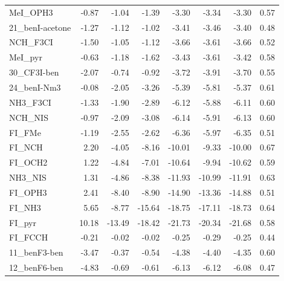{\begin{longtable}{lrrrrrrr}
MeI\_OPH3 & -0.87 & -1.04 & -1.39 & -3.30 & -3.34 & -3.30 & 0.57\\
21\_benI-acetone & -1.27 & -1.12 & -1.02 & -3.41 & -3.46 & -3.40 & 0.48\\
NCH\_F3CI & -1.50 & -1.05 & -1.12 & -3.66 & -3.61 & -3.66 & 0.52\\
MeI\_pyr & -0.63 & -1.18 & -1.62 & -3.43 & -3.61 & -3.42 & 0.58\\
30\_CF3I-ben & -2.07 & -0.74 & -0.92 & -3.72 & -3.91 & -3.70 & 0.55\\
24\_benI-Nm3 & -0.08 & -2.05 & -3.26 & -5.39 & -5.81 & -5.37 & 0.61\\
NH3\_F3CI & -1.33 & -1.90 & -2.89 & -6.12 & -5.88 & -6.11 & 0.60\\
NCH\_NIS & -0.97 & -2.09 & -3.08 & -6.14 & -5.91 & -6.13 & 0.60\\
FI\_FMe & -1.19 & -2.55 & -2.62 & -6.36 & -5.97 & -6.35 & 0.51\\
FI\_NCH & 2.20 & -4.05 & -8.16 & -10.01 & -9.33 & -10.00 & 0.67\\
FI\_OCH2 & 1.22 & -4.84 & -7.01 & -10.64 & -9.94 & -10.62 & 0.59\\
NH3\_NIS & 1.31 & -4.86 & -8.38 & -11.93 & -10.99 & -11.91 & 0.63\\
FI\_OPH3 & 2.41 & -8.40 & -8.90 & -14.90 & -13.36 & -14.88 & 0.51\\
FI\_NH3 & 5.65 & -8.77 & -15.64 & -18.75 & -17.11 & -18.73 & 0.64\\
FI\_pyr & 10.18 & -13.49 & -18.42 & -21.73 & -20.34 & -21.68 & 0.58\\
FI\_FCCH & -0.21 & -0.02 & -0.02 & -0.25 & -0.29 & -0.25 & 0.44\\
11\_benF3-ben & -3.47 & -0.37 & -0.54 & -4.38 & -4.40 & -4.35 & 0.60\\
12\_benF6-ben & -4.83 & -0.69 & -0.61 & -6.13 & -6.12 & -6.08 & 0.47\\
\end{longtable}}
